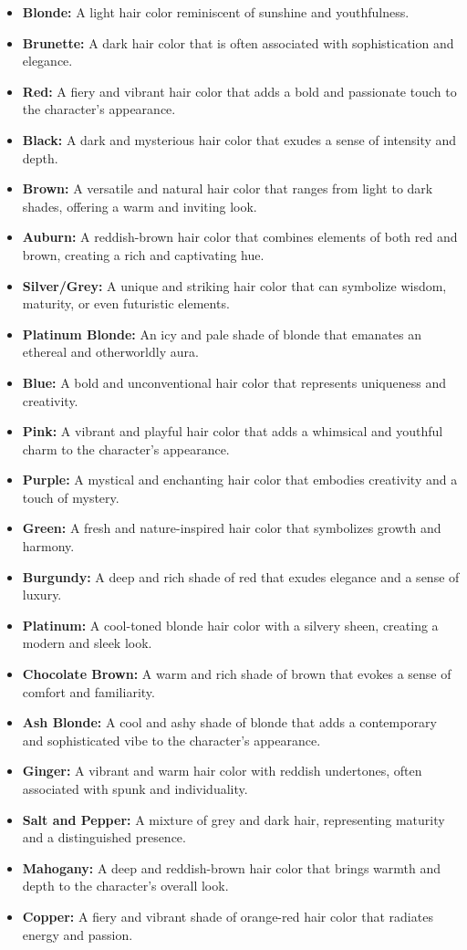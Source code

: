 \begin{itemize}
    \item \textbf{Blonde:} A light hair color reminiscent of sunshine and youthfulness.
    \item \textbf{Brunette:} A dark hair color that is often associated with sophistication and elegance.
    \item \textbf{Red:} A fiery and vibrant hair color that adds a bold and passionate touch to the character's appearance.
    \item \textbf{Black:} A dark and mysterious hair color that exudes a sense of intensity and depth.
    \item \textbf{Brown:} A versatile and natural hair color that ranges from light to dark shades, offering a warm and inviting look.
    \item \textbf{Auburn:} A reddish-brown hair color that combines elements of both red and brown, creating a rich and captivating hue.
    \item \textbf{Silver/Grey:} A unique and striking hair color that can symbolize wisdom, maturity, or even futuristic elements.
    \item \textbf{Platinum Blonde:} An icy and pale shade of blonde that emanates an ethereal and otherworldly aura.
    \item \textbf{Blue:} A bold and unconventional hair color that represents uniqueness and creativity.
    \item \textbf{Pink:} A vibrant and playful hair color that adds a whimsical and youthful charm to the character's appearance.
    \item \textbf{Purple:} A mystical and enchanting hair color that embodies creativity and a touch of mystery.
    \item \textbf{Green:} A fresh and nature-inspired hair color that symbolizes growth and harmony.
    \item \textbf{Burgundy:} A deep and rich shade of red that exudes elegance and a sense of luxury.
    \item \textbf{Platinum:} A cool-toned blonde hair color with a silvery sheen, creating a modern and sleek look.
    \item \textbf{Chocolate Brown:} A warm and rich shade of brown that evokes a sense of comfort and familiarity.
    \item \textbf{Ash Blonde:} A cool and ashy shade of blonde that adds a contemporary and sophisticated vibe to the character's appearance.
    \item \textbf{Ginger:} A vibrant and warm hair color with reddish undertones, often associated with spunk and individuality.
    \item \textbf{Salt and Pepper:} A mixture of grey and dark hair, representing maturity and a distinguished presence.
    \item \textbf{Mahogany:} A deep and reddish-brown hair color that brings warmth and depth to the character's overall look.
    \item \textbf{Copper:} A fiery and vibrant shade of orange-red hair color that radiates energy and passion.
\end{itemize}

